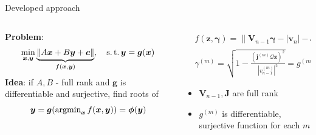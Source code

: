 \documentclass[../main.tex]{subfiles}
\begin{document}
%
%



\begin{frame}[t]{Developed approach}
\begin{columns}
\colorbox{gray!20}{\begin{column}{0.5\textwidth}

\textbf{Problem}:
\begin{equation*}
\min_{\bm{x}, \bm{y}} \underbrace{\|A\bm{x} + B\bm{y} + \bm{c}\|}_{f(\bm{x}, \bm{y})}, \quad \operatorname{s.t.} \bm{y} = \bm{g}(\bm{x})
\end{equation*}
\textbf{Idea}: if $A, B$ - full rank and $\bm{g}$ is differentiable and surjective, find roots of 
$$\bm{y} = \bm{g}(\operatorname{argmin}_{\bm{x}} f(\bm{x}, \bm{y})) = \bm{\phi}(\bm{y})$$
\end{column}}


\begin{column}{0.5\textwidth}
\begin{equation*}
\begin{split}
& f(\bm{z}, \bm{\gamma}) = \Big\| \bm{V}_{n-1}\bm{\gamma} - |\bm{v}_{n}| - \bm{J}\bm{z} \Big\|_2^2 \\
& \gamma^{(m)} = \sqrt{1 - \frac{( \bm{j}^{(m)}\mathcal{Q}\bm{z} )^2}{|v^{(m)}_{n-1}|^2} } = g^{(m)}(\bm{z})
\end{split}
\end{equation*}

\begin{itemize}
		\item $\bm{V}_{n-1}, \bm{J}$ are full rank
		\item $g^{(m)}$ is differentiable, surjective function for each $m$
	\end{itemize}

\end{column}
\end{columns}

\end{frame}
\end{document}
